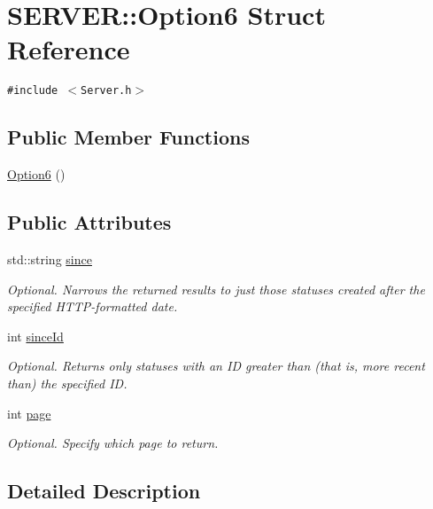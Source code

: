 \hypertarget{structSERVER_1_1Option6}{
\section{SERVER::Option6 Struct Reference}
\label{structSERVER_1_1Option6}
}
{\tt \#include $<$Server.h$>$}

\subsection*{Public Member Functions}
\begin{CompactItemize}
\item 
\hyperlink{structSERVER_1_1Option6_ee28e2e135930a50d7ecb1cdcffe2eb3}{Option6} ()
\end{CompactItemize}
\subsection*{Public Attributes}
\begin{CompactItemize}
\item 
std::string \hyperlink{structSERVER_1_1Option6_ec7f2a09a7535b3fc74e9f86b922631f}{since}
\begin{CompactList}\small\item\em Optional. Narrows the returned results to just those statuses created after the specified HTTP-formatted date. \item\end{CompactList}\item 
int \hyperlink{structSERVER_1_1Option6_f2fde04299eea0db7e9bc50235bf3465}{sinceId}
\begin{CompactList}\small\item\em Optional. Returns only statuses with an ID greater than (that is, more recent than) the specified ID. \item\end{CompactList}\item 
int \hyperlink{structSERVER_1_1Option6_2ded4c2cbd9fa82ef1f27cb98c6849ac}{page}
\begin{CompactList}\small\item\em Optional. Specify which page to return. \item\end{CompactList}\end{CompactItemize}


\subsection{Detailed Description}



